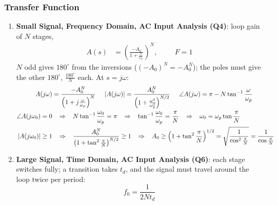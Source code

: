 \subsubsection{Transfer Function}
\begin{enumerate}
  \item \textbf{Small Signal, Frequency Domain, AC Input Analysis (Q4)}: loop gain of \(N\) stages,
\begin{align*}
  A(s) &= \left(\frac{-A_0}{1 + \frac{s}{\omega_p}}\right)^N, \hspace{1cm} F = 1 \tag{1}
\end{align*}
\(N\) odd gives \(180^\circ\) from the inversions (\((-A_0)^N = -A_0^N\)); the poles must give the other
\(180^\circ\), \(\frac{180^\circ}{N}\) each. At \(s = j\omega\):
\begin{align*}
  A(j\omega) &= \frac{-A_0^N}{\left(1 + j\frac{\omega}{\omega_p}\right)^N} \hspace{0.5cm}
  |A(j\omega)| = \frac{A_0^N}{\left(1 + \frac{\omega^2}{\omega_p^2}\right)^{N/2}} \hspace{0.5cm}
  \angle A(j\omega) = \pi - N\tan^{-1}\frac{\omega}{\omega_p} \\
  \angle A(j\omega_0) = 0 &\hspace{0.3cm} \Rightarrow \hspace{0.3cm} N\tan^{-1}\frac{\omega_0}{\omega_p} = \pi \hspace{0.3cm} \Rightarrow \hspace{0.3cm} \tan^{-1}\frac{\omega_0}{\omega_p} = \frac{\pi}{N} \hspace{0.3cm} \Rightarrow \hspace{0.3cm} \omega_0 = \omega_p \tan\frac{\pi}{N} \\
  |A(j\omega_0)| \geq 1 &\hspace{0.3cm} \Rightarrow \hspace{0.3cm} \frac{A_0^N}{\left(1 + \tan^2\frac{\pi}{N}\right)^{N/2}} \geq 1 \hspace{0.3cm} \Rightarrow \hspace{0.3cm} A_0 \geq \left(1 + \tan^2\frac{\pi}{N}\right)^{1/2} = \sqrt{\frac{1}{\cos^2\frac{\pi}{N}}} = \frac{1}{\cos\frac{\pi}{N}}
\end{align*}
  \item \textbf{Large Signal, Time Domain, AC Input Analysis (Q6)}: each stage switches fully; a
    transition takes \(t_d\), and the signal must travel around the loop twice per period:
\[
  f_0 = \frac{1}{2 N t_d} \tag{2}
\]
\end{enumerate}

